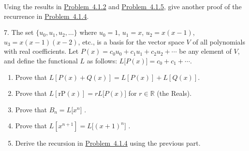 \documentclass[10pt,]{book}
\theoremstyle{plain}
\theoremstyle{definition}
\theoremstyle{definition}
\numberwithin{equation}{chapter}
\def\R{\mathbb R}
\begin{document}
\begin{exerciselist}
Using the results in \hyperlink{ex-bell-as-stirlings}{Problem~4.1.2} and \hyperlink{ex-stirling-recurrence}{Problem~4.1.5}, give another proof of the recurrence in \hyperlink{ex-bell-recurrence}{Problem~4.1.4}.%
\par\smallskip
\item[7.]\hypertarget{exercise-64}{}\hypertarget{p-172}{}%
The set \(\{u_{0}, u_{1}, u_{2}, \ldots \}\) where \(u_{0} = 1\), \(u_{1} = x\), \(u_{2} = x(x - 1)\), \(u_{3} = x(x - 1)(x - 2)\), etc., is a basis for the vector space \(V\) of all polynomials with real coefficients. Let \(P(x) = c_{0}u_{0} + c_{1}u_{1} + c_{2}u_{2} + \cdots\) be any element of \(V\), and define the functional \(L\) as follows: \(L\lbrack P(x)\rbrack = c_{0} + c_{1} + \cdots\).%
\par
\hypertarget{p-173}{}%
\leavevmode%
\begin{enumerate}[label=(\alph*)]
\item\hypertarget{li-33}{}\hypertarget{p-174}{}%
Prove that \(L\left\lbrack P\left( x \right) + Q\left( x \right) \right\rbrack = L\left\lbrack P\left( x \right) \right\rbrack + L\left\lbrack Q\left( x \right) \right\rbrack.\)%
\item\hypertarget{li-34}{}\hypertarget{p-175}{}%
Prove that \(L\left\lbrack \text{rP}\left( x \right) \right\rbrack = rL\lbrack P\left( x \right)\rbrack\) for \(r \in \R\) (the Reals).%
\item\hypertarget{li-35}{}\hypertarget{p-176}{}%
Prove that \(B_{n} = L\lbrack x^{n}\rbrack\) .%
\item\hypertarget{li-36}{}\hypertarget{p-177}{}%
Prove that \(L\left\lbrack x^{n + 1} \right\rbrack = L\lbrack\left( x + 1 \right)^{n}\rbrack\) .%
\item\hypertarget{li-37}{}\hypertarget{p-178}{}%
Derive the recursion in \hyperlink{ex-bell-recurrence}{Problem~4.1.4} using the previous part.%
\end{enumerate}
%
\par\smallskip
\end{exerciselist}
\typeout{************************************************}
\typeout{************************************************}
\end{document}
